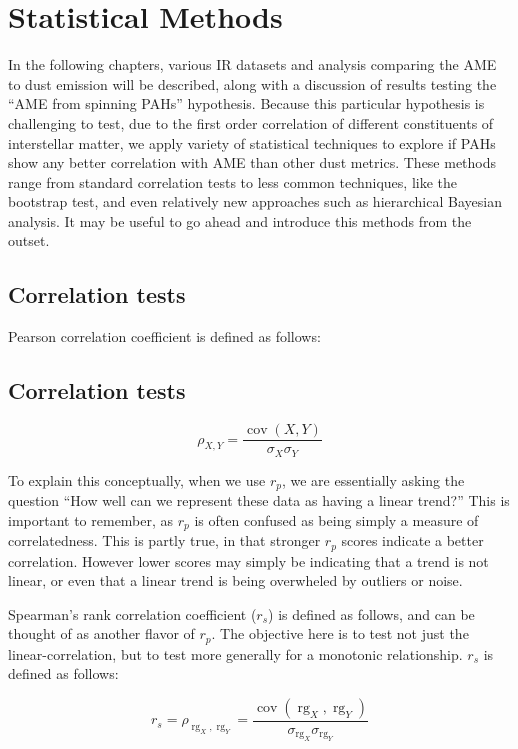 \section{Statistical Methods}

    In the following chapters, various IR datasets and analysis comparing the AME to dust emission will be described, along with a discussion of results testing the ``AME from spinning PAHs'' hypothesis. Because this particular hypothesis is challenging to test, due to the first order correlation of different constituents of interstellar matter, we apply variety of statistical techniques to explore if PAHs show any better correlation with AME than other dust metrics. These methods range from standard correlation tests to less common techniques, like the bootstrap test, and even relatively new approaches such as hierarchical Bayesian analysis. It may be useful to go ahead and introduce this methods from the outset.

    \subsection{Correlation tests}

  Pearson correlation coefficient is defined as follows:

  \subsection{Correlation tests}
     \begin{equation}
     \rho_{X,Y}= \frac{\operatorname{cov}(X,Y)}{\sigma_X \sigma_Y}
   \end{equation}

   To explain this conceptually, when we use $r_{p}$, we are essentially asking the question ``How well can we represent these data as having a linear trend?'' This is important to remember, as $r_{p}$ is often confused as being simply a measure of correlatedness. This is partly true, in that stronger $r_p$ scores indicate a better correlation. However lower scores may simply be indicating that a trend is not linear, or even that a linear trend is being overwheled by outliers or noise.

    Spearman's rank correlation coefficient ($r_s$) is defined as follows, and can be thought of as another flavor of $r_p$. The objective here is to test not just the linear-correlation, but to test more generally for a monotonic relationship. $r_s$ is defined as follows:

    \begin{equation}
      r_s = \rho_{\operatorname{rg}_X,\operatorname{rg}_Y} = \frac {\operatorname{cov}(\operatorname{rg}_X,\operatorname{rg}_Y)} { \sigma_{\operatorname{rg}_X} \sigma_{\operatorname{rg}_Y} }
    \end{equation}

